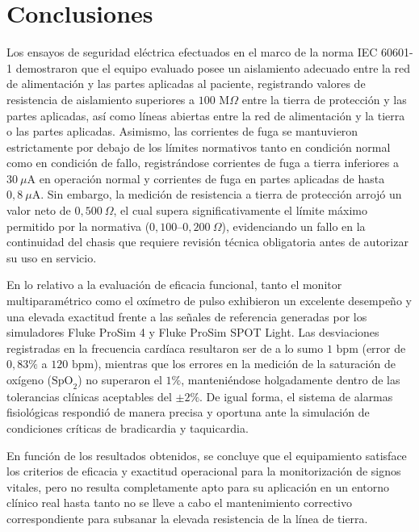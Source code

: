 \section{Conclusiones}
Los ensayos de seguridad eléctrica efectuados en el marco de la norma IEC 60601-1 demostraron que el equipo evaluado posee un aislamiento adecuado entre la red de alimentación y las partes aplicadas al paciente, registrando valores de resistencia de aislamiento superiores a $100\text{ M}\Omega$ entre la tierra de protección y las partes aplicadas, así como líneas abiertas entre la red de alimentación y la tierra o las partes aplicadas. Asimismo, las corrientes de fuga se mantuvieron estrictamente por debajo de los límites normativos tanto en condición normal como en condición de fallo, registrándose corrientes de fuga a tierra inferiores a $30\ \mu\text{A}$ en operación normal y corrientes de fuga en partes aplicadas de hasta $0{,}8\ \mu\text{A}$. Sin embargo, la medición de resistencia a tierra de protección arrojó un valor neto de $0{,}500\ \Omega$, el cual supera significativamente el límite máximo permitido por la normativa ($0{,}100\text{--}0{,}200\ \Omega$), evidenciando un fallo en la continuidad del chasis que requiere revisión técnica obligatoria antes de autorizar su uso en servicio.

En lo relativo a la evaluación de eficacia funcional, tanto el monitor multiparamétrico como el oxímetro de pulso exhibieron un excelente desempeño y una elevada exactitud frente a las señales de referencia generadas por los simuladores Fluke ProSim 4 y Fluke ProSim SPOT Light. Las desviaciones registradas en la frecuencia cardíaca resultaron ser de a lo sumo $1\text{ bpm}$ (error de $0{,}83\%$ a $120\text{ bpm}$), mientras que los errores en la medición de la saturación de oxígeno ($\text{SpO}_2$) no superaron el $1\%$, manteniéndose holgadamente dentro de las tolerancias clínicas aceptables del $\pm 2\%$. De igual forma, el sistema de alarmas fisiológicas respondió de manera precisa y oportuna ante la simulación de condiciones críticas de bradicardia y taquicardia.

En función de los resultados obtenidos, se concluye que el equipamiento satisface los criterios de eficacia y exactitud operacional para la monitorización de signos vitales, pero no resulta completamente apto para su aplicación en un entorno clínico real hasta tanto no se lleve a cabo el mantenimiento correctivo correspondiente para subsanar la elevada resistencia de la línea de tierra.